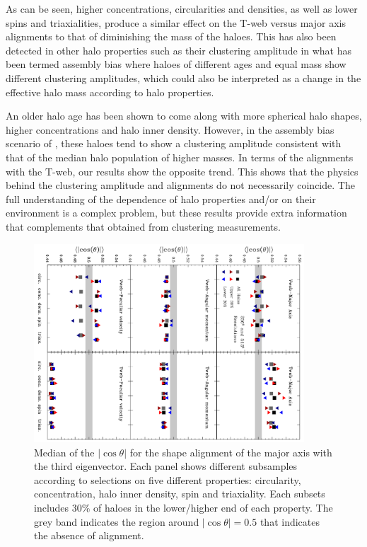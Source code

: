 \documentclass[useAMS,usenatbib]{mn2e}
\begin{document}
As can be seen, higher concentrations, circularities and densities,
as well as lower spins and triaxialities, produce a similar effect on the
T-web versus major axis alignments to that of diminishing the mass
of the haloes.  This has also been detected in other halo properties such
as their clustering amplitude in what has been termed assembly bias
\citep[][e.g.]{Gao2005,Li2008,Lacerna2011} where haloes of different
ages and equal mass show different clustering amplitudes, which could
also be interpreted as a change in the effective halo mass according
to halo properties.

An older halo age has been shown to come along with more spherical halo
shapes, higher concentrations and halo inner density.  However, in the
assembly bias scenario of \cite{Gao2005}, these haloes tend to show a clustering
amplitude consistent with that of the median halo population of higher masses.
In terms of the alignments with the T-web, our results show the opposite
trend.  This shows that the physics behind the clustering amplitude and
alignments do not necessarily coincide.  The full understanding of
the dependence of halo properties and/or on their environment is
a complex problem, but these results provide extra information that complements
that obtained from clustering measurements.


\begin{figure}
\includegraphics[width=0.90\textwidth,angle=90]{Fig6.pdf}
\caption{Median of the $|\cos\theta|$ for the shape alignment of the
  major axis with the third eigenvector. Each panel shows
  different subsamples according to selections on five different
  properties: circularity, concentration, halo inner density, spin and
  triaxiality. Each subsets includes $30\%$ of haloes in the lower/higher end of each
  property. The grey band indicates the region around
  $|\cos\theta|=0.5$ that indicates the absence of alignment.}
\label{fig:drive}
\end{figure}
\end{document}
